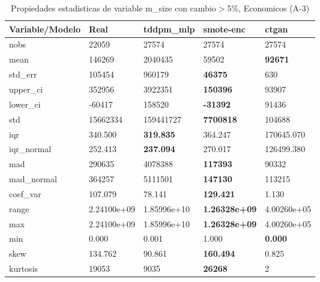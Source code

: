 \begin{table}[H]
\centering
\fontsize{8}{14}\selectfont
\caption{Propiedades estadisticas de variable m\_size con cambio\ensuremath{>}5\%, Economicos (A-3)}
\label{table-stats-economicos-a-3-m_size-short}
\begin{tabular}{|l|m{10em}|m{10em}|m{10em}|m{10em}|}
\hline
 \rowcolor[gray]{0.8}
Variable/Modelo & Real & tddpm\_mlp & smote-enc & ctgan \\
\hline nobs & 22059 & 27574 & 27574 & 27574 \\
\hline mean & 146269 & \cellcolor[rgb]{0.9, 0.54, 0.52} 2040435 & 59502 & \bfseries 92671 \\
\hline std\_err & 105454 & \cellcolor[rgb]{0.9, 0.54, 0.52} 960179 & \bfseries 46375 & 630 \\
\hline upper\_ci & 352956 & \cellcolor[rgb]{0.9, 0.54, 0.52} 3922351 & \bfseries 150396 & 93907 \\
\hline lower\_ci & -60417 & \cellcolor[rgb]{0.9, 0.54, 0.52} 158520 & \bfseries -31392 & 91436 \\
\hline std & 15662334 & \cellcolor[rgb]{0.9, 0.54, 0.52} 159441727 & \bfseries 7700818 & 104688 \\
\hline iqr & 340.500 & \bfseries 319.835 & 364.247 & \cellcolor[rgb]{0.9, 0.54, 0.52} 170645.070 \\
\hline iqr\_normal & 252.413 & \bfseries 237.094 & 270.017 & \cellcolor[rgb]{0.9, 0.54, 0.52} 126499.380 \\
\hline mad & 290635 & \cellcolor[rgb]{0.9, 0.54, 0.52} 4078388 & \bfseries 117393 & 90332 \\
\hline mad\_normal & 364257 & \cellcolor[rgb]{0.9, 0.54, 0.52} 5111501 & \bfseries 147130 & 113215 \\
\hline coef\_var & 107.079 & 78.141 & \bfseries 129.421 & \cellcolor[rgb]{0.9, 0.54, 0.52} 1.130 \\
\hline range & 2.24100e+09 & \cellcolor[rgb]{0.9, 0.54, 0.52} 1.85996e+10 & \bfseries 1.26328e+09 & 4.00260e+05 \\
\hline max & 2.24100e+09 & \cellcolor[rgb]{0.9, 0.54, 0.52} 1.85996e+10 & \bfseries 1.26328e+09 & 4.00260e+05 \\
\hline min & 0.000 & 0.001 & \cellcolor[rgb]{0.9, 0.54, 0.52} 1.000 & \bfseries 0.000 \\
\hline skew & 134.762 & 90.861 & \bfseries 160.494 & \cellcolor[rgb]{0.9, 0.54, 0.52} 0.825 \\
\hline kurtosis & 19053 & 9035 & \bfseries 26268 & \cellcolor[rgb]{0.9, 0.54, 0.52} 2 \\

\end{tabular}
\end{table}
